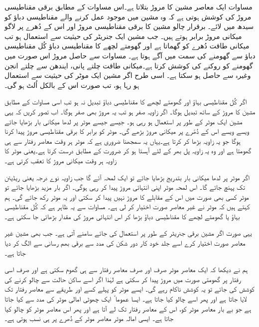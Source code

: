 مساوات  ایک معاصر مشین کا مروڑ بتلاتا ہے۔اس مساوات کے مطابق برقی مقناطیسی مروڑ کی کوشش ہوتی ہے کہ وہ مشین میں موجود عمل کرنے والے مقناطیسی دباؤ کو سیدھ میں لائے۔ برقرار  چالو  مشین کا برقی مقناطیسی مروڑ اور اس کے دُھرے پر لاگو میکانی مروڑ برابر ہوتے ہیں۔ جب مشین ایک جنریٹر کی حیثیت سے استعمال ہو تب میکانی طاقت  دُھرے کو گھماتا ہے اور گھومتے لچھے کا مقناطیسی دباؤ کُل مقناطیسی دباؤ سے گھومنے کی سمت میں آگے ہوتا ہے۔ مساوات سے حاصل مروڑ اس صورت میں گھومنے کو روکنے کی کوشش کرتا ہے۔میکانی طاقت چلتے پانی، ایندھن سے چلتے انجن وغیرہ سے حاصل ہو سکتا ہے۔ اسی طرح اگر مشین ایک موٹر کی حیثیت سے استعمال ہو رہا ہو، تب صورت اس کے بالکل اُلٹ ہو گی۔

اگر کُل مقناطیسی بہاؤ   اور گھومتے لچھے کا مقناطیسی دباؤ  تبدیل نہ ہو تب اسی مساوات کے مطابق مشین کا مروڑ   کے ساتھ تبدیل ہوگا۔ اگر زاویہ  صفر ہو تب یہ مروڑ بھی صفر ہوگا۔ اب  تصور کریں کہ یہی مشین ایک موٹر کے طور پر استعمال ہو رہی ہو۔ جیسے جیسے موٹر پر لدھا میکانی بار بڑھایا جائے ویسے ویسے اس کے دُھّرے پر میکانی مروڑ بڑھے گی۔ موٹر کو برابر کا برقی مقناطیسی مروڑ پیدا کرنا ہوگا جو یہ زاویہ بڑھا کر کرتا ہے۔یہاں یہ سمجھنا ضروری ہے کہ موٹر ہر وقت معاصر رفتار سے ہی گھومتا ہے اور وہ یہ زاویہ پل بھر کے لئے آہستا ہو کر ضرورت کے مطابق درست کرتا ہے۔یعنی موٹر کا زاویہ  ہر وقت میکانی مروڑ کا تعقب  کرتی ہے۔

اگر موٹر پر لدھا میکانی بار بتدریج بڑھایا جائے تو ایک لمحہ آئے گا جب زاویہ  نوے درجہ یعنی   ریڈیئن تک پہنچ جائے گا۔ اس لمحہ موٹر اپنی انتہائی مروڑ  پیدا کر رہی ہوگی۔ اگر بار  مزید بڑھایا جائے تو موٹر کسی بھی صورت میں اس کے مقابلے کا مروڑ نہیں پیدا کر سکتی اور یہ موٹر رکھ جائے گی۔ ہم کہتے ہیں کہ موٹر نے غیر معاصر صورت اختیار کر لی ہے۔ مساوات سے یہ ظاہر ہے کہ کُل مقناطیسی بہاؤ یا گھومتے لچھے کا مقناطیسی دباؤ بڑھا کر اس انتہائی مروڑ کی مقدار بڑھائی جا سکتی ہے۔

یہی صورت اگر مشین برقی جنریٹر کے طور پر استعمال کی جائے سامنے آتی ہے۔ جب بھی مشین غیر معاصر صورت اختیار کرے اسے جلد خود کار دور شکن کی مدد سے برقی بھم رسانی سے الگ کر دیا جاتا ہے۔

ہم نے دیکھا کہ ایک معاصر موٹر صرف اور صرف معاصر رفتار سے ہی گھوم سکتی ہے اور صرف اسی رفتار پر گھومتی صورت میں مروڑ پیدا کر سکتی ہے لہٰذا اگر اسے ساکن حالت سے چالو  کرنے کی کوشش کی جائے تو یہ کوشش ناکام رہے گی۔ ایسے موٹر کو پہلے کسے اور طریقے سے معاصر رفتار تک لایا جاتا ہے اور پھر اسے چالو کیا جاتا ہے۔ ایسا عموما ً ایک چھوٹی امالی موٹر  کی مدد سے کیا جاتا ہے جو بے بار معاصر موٹر کو، اس کے معاصر رفتار تک لے آتا ہے اور پھر اس معاصر موٹر کو چالو کیا جاتا ہے۔ ایسی امالہ موٹر معاصر موٹر کے دُھرے پر ہی نسب ہوتی ہے۔

